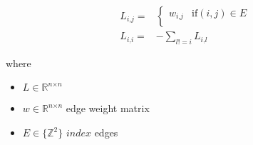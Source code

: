 \documentclass[12pt]{article}
\begin{document}
\begin{align*}
\textit{L}_{\textit{i}, \textit{j}} = & \begin{cases} \textit{w}_{\textit{i}, \textit{j}} & \text{if}  \left( \textit{i}, \textit{j} \right) \in \textit{E}  \\ \end{cases}  \\
\textit{L}_{\textit{i}, \textit{i}} = & -\sum_{\textit{l} != \textit{i}} \textit{L}_{\textit{i}, \textit{l}}
\end{align*}

where
\begin{itemize}
\item $\textit{L} \in \mathbb{R}^{ \textit{n} \times \textit{n} }$
\item $\textit{w} \in \mathbb{R}^{ \textit{n} \times \textit{n} }$ edge weight matrix
\item $\textit{E} \in \{\mathbb{{Z}}^{{2}}\} \textit{{ index}}$ edges
\end{itemize}
\end{document}
